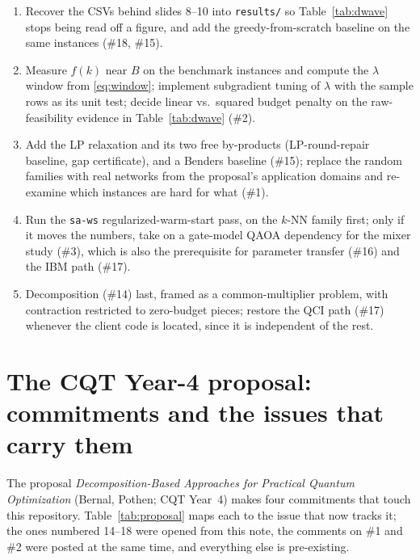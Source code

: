 \documentclass[11pt]{article}
\newcommand{\code}[1]{\texttt{#1}}
\begin{document}
\begin{enumerate}[leftmargin=1.5em]
\item Recover the CSVs behind slides 8--10 into \code{results/} so Table~\ref{tab:dwave} stops being read off a figure, and add the greedy-from-scratch baseline on the same instances (\#18, \#15).
\item Measure $f(k)$ near $B$ on the benchmark instances and compute the $\lambda$ window from \eqref{eq:window}; implement subgradient tuning of $\lambda$ with the sample rows as its unit test; decide linear vs.\ squared budget penalty on the raw-feasibility evidence in Table~\ref{tab:dwave} (\#2).
\item Add the LP relaxation and its two free by-products (LP-round-repair baseline, gap certificate), and a Benders baseline (\#15); replace the random families with real networks from the proposal's application domains and re-examine which instances are hard for what (\#1).
\item Run the \code{sa-ws} regularized-warm-start pass, on the $k$-NN family first; only if it moves the numbers, take on a gate-model QAOA dependency for the mixer study (\#3), which is also the prerequisite for parameter transfer (\#16) and the IBM path (\#17).
\item Decomposition (\#14) last, framed as a common-multiplier problem, with contraction restricted to zero-budget pieces; restore the QCI path (\#17) whenever the client code is located, since it is independent of the rest.
\end{enumerate}

\section{The CQT Year-4 proposal: commitments and the issues that carry them}
\label{sec:proposal}

The proposal \emph{Decomposition-Based Approaches for Practical Quantum Optimization} (Bernal, Pothen; CQT Year~4) makes four commitments that touch this repository. Table~\ref{tab:proposal} maps each to the issue that now tracks it; the ones numbered 14--18 were opened from this note, the comments on \#1 and \#2 were posted at the same time, and everything else is pre-existing.
\end{document}
